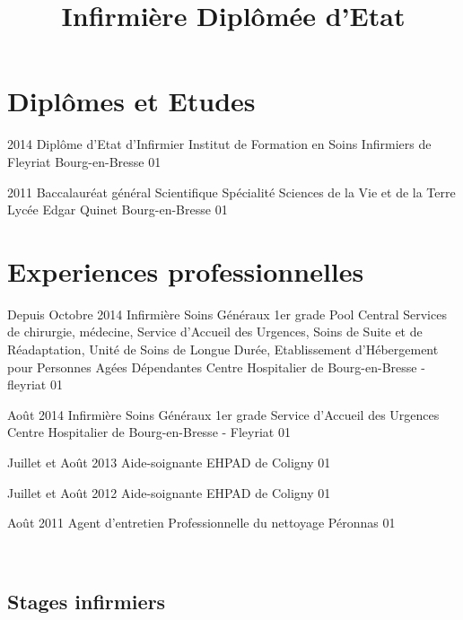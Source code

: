 \documentclass[10pt,a4paper]{moderncv}
\title{Infirmière Diplômée d'Etat}
\begin{document}
\maketitle
\pagestyle{empty}


\section{Diplômes et Etudes}

\cventry
	{2014}
	{Diplôme d'Etat d'Infirmier}
	{Institut de Formation en Soins Infirmiers de Fleyriat}
	{Bourg-en-Bresse}
	{01}
	{}

\cventry
	{2011}
	{Baccalauréat général Scientifique}
	{Spécialité Sciences de la Vie et de la Terre}
	{Lycée Edgar Quinet}
	{Bourg-en-Bresse}
	{01}



\section{Experiences professionnelles}


\cventry
	{Depuis Octobre 2014}
	{Infirmière Soins Généraux 1er grade}
	{Pool Central}
	{Services de chirurgie, médecine, Service d'Accueil des Urgences, Soins de Suite et de Réadaptation, Unité de Soins de Longue Durée, Etablissement d'Hébergement pour Personnes Agées Dépendantes}
	{Centre Hospitalier de Bourg-en-Bresse - fleyriat}
	{01}

\cventry
	{Août 2014}
	{Infirmière Soins Généraux 1er grade}
	{Service d'Accueil des Urgences}
	{Centre Hospitalier de Bourg-en-Bresse - Fleyriat}
	{01}
	{}


\cventry
	{Juillet et Août 2013}
	{Aide-soignante}
	{EHPAD de Coligny}
	{01}
	{}
	{}

\cventry
    {Juillet et Août 2012}
	{Aide-soignante}
	{EHPAD de Coligny}
	{01}
	{}
	{}

\cventry
	{Août 2011}
	{Agent d'entretien}
	{Professionnelle du nettoyage}
	{Péronnas}
	{01}
	{}

~~\\

\subsection{Stages infirmiers}
	
\end{document}
